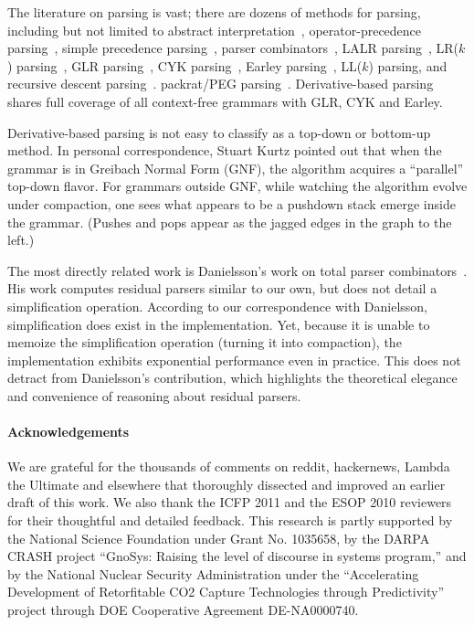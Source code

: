 The literature on parsing is vast;
there are dozens of methods for parsing, including but not limited to
abstract interpretation~\cite{mattmight:Cousot:2003:Parsing,mattmight:Cousot:2006:Parsing},
operator-precedence parsing~\cite{mattmight:Floyd:1963:Syntactic,mattmight:Pratt:1973:TopDown},
simple precedence parsing~\cite{mattmight:Dijkstra:1982:ShuntingYard},
parser combinators~\cite{mattmight:Swierstra:1998:Combinator,mattmight:Swierstra:2009:Tutorial},
LALR parsing~\cite{mattmight:DeRemer:1969:LALR}, 
LR($k$) parsing~\cite{mattmight:Knuth:1965:LR},
GLR parsing~\cite{mattmight:Masaru:1984:GLR},
CYK parsing~\cite{mattmight:Kasami:1965:CYK,mattmight:Younger:1967:CYK,mattmight:Cocke:1970:CYK},
Earley parsing~\cite{mattmight:Earley:1970:Parsing},
LL($k$) parsing, and
recursive descent parsing~\cite{mattmight:Wirth:1996:CompilerConstruction}.
packrat/PEG parsing~\cite{mattmight:Ford:2002:Packrat,mattmight:Warth:2008:PEG}.
%
Derivative-based parsing shares full coverage of all context-free
grammars with GLR, CYK and Earley.

Derivative-based parsing 
is not easy to classify as a top-down or bottom-up method.
%
In personal correspondence, Stuart Kurtz
pointed out that when the grammar is in Greibach Normal Form (GNF),
the algorithm acquires a ``parallel'' top-down flavor.
%
For grammars outside GNF, while watching the algorithm evolve under compaction,
one sees what appears to be a pushdown stack emerge inside the grammar.
%
(Pushes and pops appear as the jagged edges in the graph to the left.)

The most directly related work is Danielsson's work on total parser
combinators~\cite{mattmight:Danielsson:2010:Total}.
%
His work computes residual parsers similar to our own, but does not detail a
simplification operation.
%
According to our correspondence with Danielsson, simplification does exist in
the implementation.
%
Yet, because it is unable to memoize the simplification operation (turning it
into compaction), the implementation exhibits exponential performance even in
practice.
%
This does not detract from Danielsson's contribution, which highlights the
theoretical elegance and convenience of reasoning about residual parsers.


\paragraph{Acknowledgements} 
We are grateful for the thousands of comments on
reddit, hackernews, Lambda the Ultimate and elsewhere that thoroughly
dissected and improved an earlier draft of this work.
%
We also thank the ICFP 2011 and the ESOP 2010 reviewers for their thoughtful and detailed feedback.
%
This research is partly supported by the National Science
Foundation under Grant No. 1035658, 
by the DARPA CRASH project ``GnoSys: Raising the level of discourse in systems program,''
and by the National Nuclear Security Administration under 
the ``Accelerating Development of Retorfitable CO2 Capture Technologies through Predictivity'' project
through DOE Cooperative Agreement 
DE-NA0000740.


